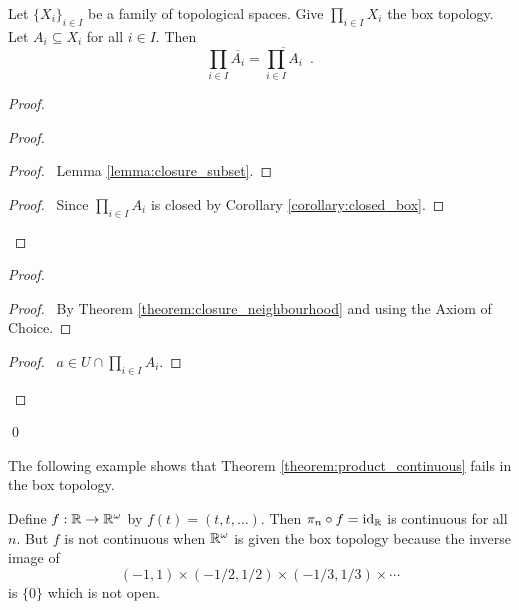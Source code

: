 \begin{proposition}[AC]
    Let $\{ X_i \}_{i \in I}$ be a family of topological spaces. Give $\prod_{i \in I} X_i$ the box topology.
    Let $A_i \subseteq X_i$ for all $i \in I$.
    Then
    \[ \prod_{i \in I} \overline{A_i} = \overline{\prod_{i \in I} A_i} \enspace . \]
\end{proposition}

\begin{proof}
    \pf
    \begin{proof}
        \begin{proof}
            \pf\ Lemma \ref{lemma:closure_subset}.
        \end{proof}
        \qedstep
        \begin{proof}
            \pf\ Since $\prod_{i \in I} A_i$ is closed by Corollary \ref{corollary:closed_box}.
        \end{proof}
    \end{proof}
    \begin{proof}
        \begin{proof}
            \pf\ By Theorem \ref{theorem:closure_neighbourhood} and  using the Axiom of Choice.
        \end{proof}
        \qedstep
        \begin{proof}
            \pf\ $a \in U \cap \prod_{i \in I} A_i$.
        \end{proof}
    \end{proof}
    \qed
\end{proof}

The following example shows that Theorem \ref{theorem:product_continuous} fails in the box topology.

\begin{example}
    Define $f : \mathbb{R} \rightarrow \mathbb{R}^\omega$ by $f(t) = (t, t, \ldots)$. Then $\pi_n \circ f = \mathrm{id}_{\mathbb{R}}$ is continuous for all $n$.
    But $f$ is not continuous when $\mathbb{R}^\omega$ is given the box topology because the inverse image of
    \[ (-1,1) \times (-1/2, 1/2) \times (-1/3,1/3) \times \cdots \]
    is $\{0\}$ which is not open.
\end{example}

